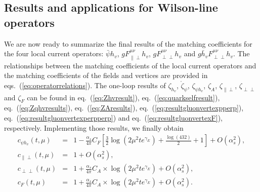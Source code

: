 \subsection{Results and applications for Wilson-line operators}
We are now ready to summarize the final results of the matching coefficients for the four local current operators: $\bar{\psi} h_v$, $gF^{\mu\nu}_{\|\perp}h_v$, $gF^{\mu\nu}_{\perp\perp}h_v$ and $g\bar{h}_vF^{\mu\nu}_{\perp\perp}h_v$. The relationships between the matching coefficients of the local current operators and the matching coefficients of the fields and vertices are provided in eqs.~(\ref{eq:operatorrelations}).
The one-loop results of $\zeta_{h_v}$, $\mathring{\zeta}_{\psi}$,  $\zeta_{\psi h_v}$, $\zeta_{A}$, $\zeta_{\|\perp}$,  $\zeta_{\perp\perp}$ and $\zeta_F$ can be found in eq.~(\ref{eq:Zhvresult}), eq.~(\ref{eq:quarkselfresult}), eq.~(\ref{eq:Zqhvresults}), eq.~(\ref{eq:ZAresults}), eq.~(\ref{eq:resultgluonvertexpperp}), eq.~(\ref{eq:resultgluonvertexperpperp}) and eq.~(\ref{eq:resultgluonvertexF}), respectively. Implementing those results, we finally obtain
\begin{eqnarray}
\label{eq:cpsihvfinal}
c_{\psi h_v}(t, \mu) &=& 1- \frac{\alpha_s}{4\pi}C_F\left[\frac{3}{2}\log\left(2\mu^2 te^{\gamma_E}\right)+\frac{\log(432)}{2}+1\right] +O(\alpha_s^2),\\
\label{eq:cpperpfinal}
c_{\|\perp} (t, \mu) &=& 1+O(\alpha_s^2),\\
\label{eq:cperpperpfinal}
c_{\perp\perp} (t, \mu) &=&1+ \frac{\alpha_s}{4\pi}C_A\times\log\left(2\mu^2 te^{\gamma_E}\right) +O(\alpha_s^2),\\
\label{eq:cpperpFfinal}
c_F(t, \mu)  &=& 1+\frac{\alpha_s}{4\pi}C_A\times\log\left(2\mu^2 te^{\gamma_E}\right) +O(\alpha_s^2).
\end{eqnarray}
